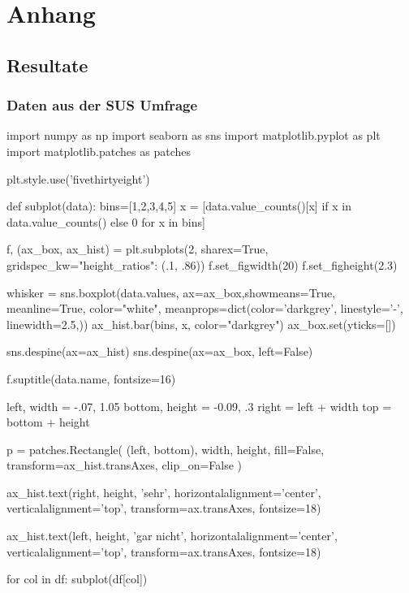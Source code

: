 \section{Anhang}



\printnoidxglossaries
\printglossary[type=\acronymtype]

\subsection{Resultate}

\subsubsection{Daten aus der SUS Umfrage}




\begin{python}
 import numpy as np
import seaborn as sns
import matplotlib.pyplot as plt
import matplotlib.patches as patches


plt.style.use('fivethirtyeight')

def subplot(data):
    bins=[1,2,3,4,5]
    x = [data.value_counts()[x] if x in data.value_counts() else 0 for x in bins]

    f, (ax_box, ax_hist) = plt.subplots(2, sharex=True, gridspec_kw={"height_ratios": (.1, .86)})
    f.set_figwidth(20)
    f.set_figheight(2.3)

    whisker = sns.boxplot(data.values,
                          ax=ax_box,showmeans=True,
                          meanline=True, color="white",
                          meanprops=dict(color='darkgrey', linestyle='-', linewidth=2.5,))
    ax_hist.bar(bins, x, color="darkgrey")
    ax_box.set(yticks=[])

    sns.despine(ax=ax_hist)
    sns.despine(ax=ax_box, left=False)

    f.suptitle(data.name, fontsize=16)

    left, width = -.07, 1.05
    bottom, height = -0.09, .3
    right = left + width
    top = bottom + height

    p = patches.Rectangle(
    (left, bottom), width, height,
    fill=False, transform=ax_hist.transAxes, clip_on=False
    )

    ax_hist.text(right, height, 'sehr',
        horizontalalignment='center',
        verticalalignment='top',
        transform=ax.transAxes,
        fontsize=18)

    ax_hist.text(left, height, 'gar nicht',
        horizontalalignment='center',
        verticalalignment='top',
        transform=ax.transAxes,
        fontsize=18)


for col in df:
    subplot(df[col])
\end{python}
